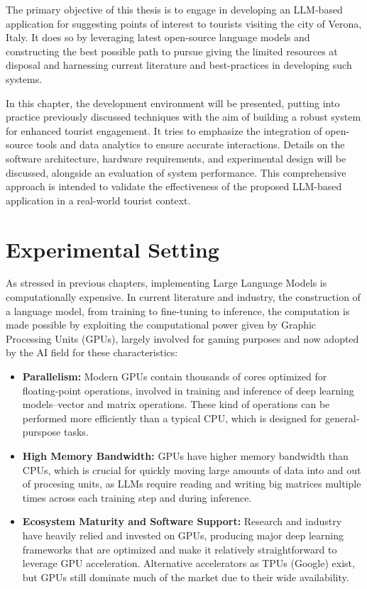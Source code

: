 The primary objective of this thesis is to engage in developing an LLM-based application for suggesting points of interest to tourists visiting the city of Verona, Italy. It does so by leveraging latest open-source language models and constructing the best possible path to pursue giving the limited resources at disposal and harnessing current literature and best-practices in developing such systems.

In this chapter, the development environment will be presented, putting into practice previously discussed techniques with the aim of building a robust system for enhanced tourist engagement. It tries to emphasize the integration of open-source tools and data analytics to ensure accurate interactions. Details on the software architecture, hardware requirements, and experimental design will be discussed, alongside an evaluation of system performance. This comprehensive approach is intended to validate the effectiveness of the proposed LLM-based application in a real-world tourist context.


\section{Experimental Setting}
\label{sec:experimental-setting}

As stressed in previous chapters, implementing Large Language Models is computationally expensive. In current literature and industry, the construction of a language model, from training to fine-tuning to inference, the computation is made possible by exploiting the computational power given by Graphic Processing Units (GPUs), largely involved for gaming purposes and now adopted by the AI field for these characteristics: \cite{gyawali2023gpu}

\begin{itemize}
    \item \textbf{Parallelism:} Modern GPUs contain thousands of cores optimized for floating-point operations, involved in training and inference of deep learning models--vector and matrix operations. These kind of operations can be performed more efficiently than a typical CPU, which is designed for general-purspose tasks.
    \item \textbf{High Memory Bandwidth:} GPUs have higher memory bandwidth than CPUs, which is crucial for quickly moving large amounts of data into and out of procesing units, as LLMs require reading and writing big matrices multiple times across each training step and during inference.
    \item \textbf{Ecosystem Maturity and Software Support:} Research and industry have heavily relied and invested on GPUs, producing major deep learning frameworks that are optimized and make it relatively straightforward to leverage GPU acceleration. Alternative accelerators as TPUs (Google) exist, but GPUs still dominate much of the market due to their wide availability.
\end{itemize}


